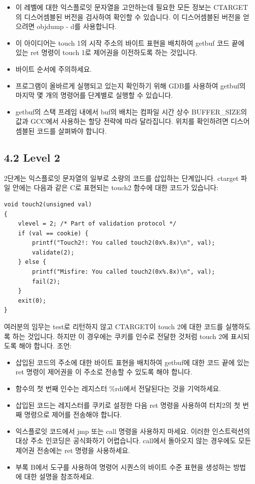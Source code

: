 \documentclass[10pt]{article}
\begin{document}
\begin{itemize}
\item 이 레벨에 대한 익스플로잇 문자열을 고안하는데 필요한 모든 정보는 CTARGET의 디스어셈블된 버전을 검사하여 확인할 수 있습니다. 이 디스어셈블된 버전을 얻으려면 objdump - d를 사용합니다.
  \item 이 아이디어는 touch 1의 시작 주소의 바이트 표현을 배치하여 getbuf 코드 끝에 있는 ret 명령이 touch 1로 제어권을 이전하도록 하는 것입니다.
  \item 바이트 순서에 주의하세요.
  \item 프로그램이 올바르게 실행되고 있는지 확인하기 위해 GDB를 사용하여 getbuf의 마지막 몇 개의 명령어를 단계별로 실행할 수 있습니다.
  \item getbuf의 스택 프레임 내에서 buf의 배치는 컴파일 시간 상수 BUFFER\_SIZE의 값과 GCC에서 사용하는 할당 전략에 따라 달라집니다. 위치를 확인하려면 디스어셈블된 코드를 살펴봐야 합니다.
\end{itemize}

\subsection*{4.2 Level 2}
2단계는 익스플로잇 문자열의 일부로 소량의 코드를 삽입하는 단계입니다.
\noindent
ctarget 파일 안에는 다음과 같은 C로 표현되는 touch2 함수에 대한 코드가 있습니다:

\begin{verbatim}
void touch2(unsigned val)
{
    vlevel = 2; /* Part of validation protocol */
    if (val == cookie) {
        printf("Touch2!: You called touch2(0x%.8x)\n", val);
        validate(2);
    } else {
        printf("Misfire: You called touch2(0x%.8x)\n", val);
        fail(2);
    }
    exit(0);
}
\end{verbatim}
\noindent
여러분의 임무는 test로 리턴하지 않고 CTARGET이 touch 2에 대한 코드를 실행하도록 하는 것입니다. 하지만 이 경우에는 쿠키를 인수로 전달한 것처럼 touch 2에 표시되도록 해야 합니다.
\noindent
조언:

\begin{itemize}
\item 삽입된 코드의 주소에 대한 바이트 표현을 배치하여 getbuf에 대한 코드 끝에 있는 ret 명령이 제어권을 이 주소로 전송할 수 있도록 해야 합니다.
  \item 함수의 첫 번째 인수는 레지스터 \%rdi에서 전달된다는 것을 기억하세요.
  \item 삽입된 코드는 레지스터를 쿠키로 설정한 다음 ret 명령을 사용하여 터치2의 첫 번째 명령으로 제어를 전송해야 합니다.
  \item 익스플로잇 코드에서 jmp 또는 call 명령을 사용하지 마세요. 이러한 인스트럭션의 대상 주소 인코딩은 공식화하기 어렵습니다. call에서 돌아오지 않는 경우에도 모든 제어권 전송에는 ret 명령을 사용하세요.
  \item 부록 B에서 도구를 사용하여 명령어 시퀀스의 바이트 수준 표현을 생성하는 방법에 대한 설명을 참조하세요.
\end{itemize}
\end{document}
